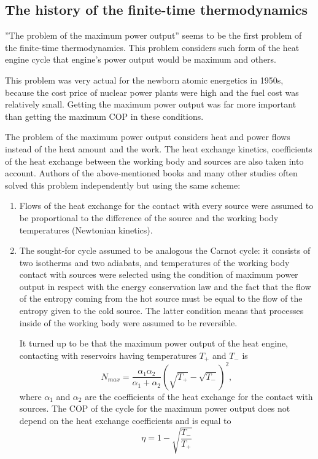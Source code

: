 \documentclass[epjST]{svjour}
\begin{document}
\subsection*{The history of the finite-time thermodynamics}
''The problem of the maximum power output'' seems to be the first problem of the finite-time thermodynamics. This problem considers such form of the heat engine cycle that engine's power output would be maximum\cite{Nov}\cite{CurAhl} and others.

This problem was very actual for the newborn atomic energetics in 1950s, because the cost price of nuclear power plants were high and the fuel cost was relatively small. Getting the maximum power output was far more important than getting the maximum COP in these conditions.

The problem of the maximum power output considers heat and power flows instead of the heat amount and the work. The heat exchange kinetics, coefficients of the heat exchange between the working body and sources are also taken into account. Authors of the above-mentioned books and many other studies often solved this problem independently but using the same scheme:

\begin{enumerate}
\item Flows of the heat exchange for the contact with every source were assumed to be proportional to the difference of the source and the working body temperatures (Newtonian kinetics).
\item The sought-for cycle assumed to be analogous the Carnot cycle: it consists of two isotherms and two adiabats, and temperatures of the working body contact with sources were selected using the condition of maximum power output in respect with the energy conservation law and the fact that the flow of the entropy coming from the hot source must be equal to the flow of the entropy given to the cold source. The latter condition means that processes inside of the working body were assumed to be reversible.

It turned up to be that the maximum power output of the heat engine, contacting with reservoirs having temperatures $T_+$ and $T_-$ is
\begin{equation}
N_{max} = \frac{\alpha_1\alpha_2}{\alpha_1+\alpha_2}\left(\sqrt{T_+}-\sqrt{T_-}\right)^2,
\end{equation}
where $\alpha_1$ and $\alpha_2$ are the coefficients of the heat exchange for the contact with sources. The COP of the cycle for the maximum power output does not depend on the heat exchange coefficients and is equal to
\begin{equation}
\eta = 1 - \sqrt{\frac{T_-}{T_+}}
\end{equation}

\end{enumerate}
\end{document}
